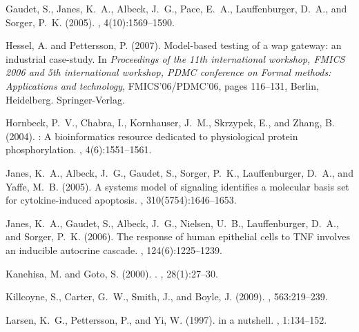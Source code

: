 \documentclass{bmcart}
\begin{document}
\begin{backmatter}
\begin{thebibliography}{}
Gaudet, S., Janes, K.~A., Albeck, J.~G., Pace, E.~A., Lauffenburger, D.~A., and
  Sorger, P.~K. (2005).
, 4(10):1569--1590.

Hessel, A. and Pettersson, P. (2007).
\newblock Model-based testing of a wap gateway: an industrial case-study.
\newblock In {\em Proceedings of the 11th international workshop, FMICS 2006
  and 5th international workshop, PDMC conference on Formal methods:
  Applications and technology}, FMICS'06/PDMC'06, pages 116--131, Berlin,
  Heidelberg. Springer-Verlag.

Hornbeck, P.~V., Chabra, I., Kornhauser, J.~M., Skrzypek, E., and Zhang, B.
  (2004).
: A bioinformatics resource dedicated to physiological
  protein phosphorylation.
, 4(6):1551--1561.

Janes, K.~A., Albeck, J.~G., Gaudet, S., Sorger, P.~K., Lauffenburger, D.~A.,
  and Yaffe, M.~B. (2005).
\newblock A systems model of signaling identifies a molecular basis set for
  cytokine-induced apoptosis.
, 310(5754):1646--1653.

Janes, K.~A., Gaudet, S., Albeck, J.~G., Nielsen, U.~B., Lauffenburger, D.~A.,
  and Sorger, P.~K. (2006).
\newblock The response of human epithelial cells to {TNF} involves an inducible
  autocrine cascade.
, 124(6):1225--1239.

Kanehisa, M. and Goto, S. (2000).
.
, 28(1):27--30.

Killcoyne, S., Carter, G.~W., Smith, J., and Boyle, J. (2009).
, 563:219--239.

Larsen, K.~G., Pettersson, P., and Yi, W. (1997).
 in a nutshell.
, 1:134--152.


\end{thebibliography}
\end{backmatter}
\end{document}
